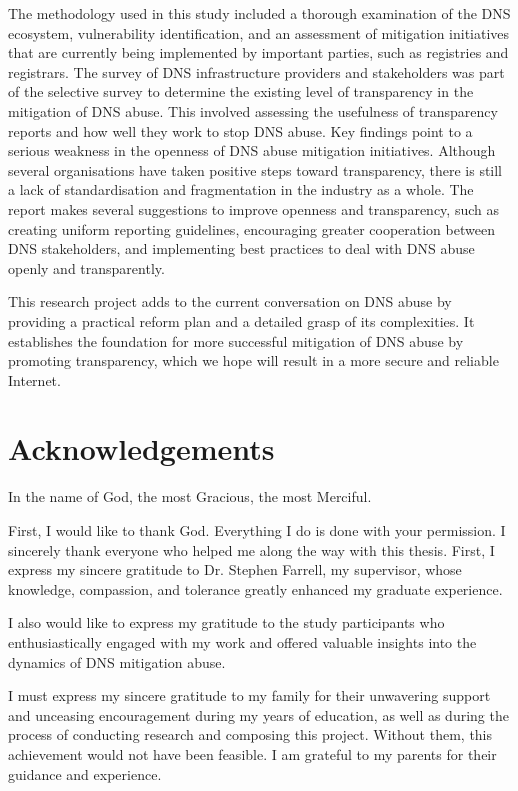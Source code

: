 \documentclass[a4paper,oneside,12pt]{book}
\numberwithin{equation}{chapter} %
\begin{document}
The methodology used in this study included a thorough examination of the DNS ecosystem, vulnerability identification, and an assessment of mitigation initiatives that are currently being implemented by important parties, such as registries and registrars. The survey of DNS infrastructure providers and stakeholders was part of the selective survey to determine the existing level of transparency in the mitigation of DNS abuse. This involved assessing the usefulness of transparency reports and how well they work to stop DNS abuse. Key findings point to a serious weakness in the openness of DNS abuse mitigation initiatives. Although several organisations have taken positive steps toward transparency, there is still a lack of standardisation and fragmentation in the industry as a whole. The report makes several suggestions to improve openness and transparency, such as creating uniform reporting guidelines, encouraging greater cooperation between DNS stakeholders, and implementing best practices to deal with DNS abuse openly and transparently.

This research project adds to the current conversation on DNS abuse by providing a practical reform plan and a detailed grasp of its complexities. It establishes the foundation for more successful mitigation of DNS abuse by promoting transparency, which we hope will result in a more secure and reliable Internet.




\newpage
\onehalfspacing\raggedright %

\section*{\Huge\textcolor{tcd_blue}{Acknowledgements}}

In the name of God, the most Gracious, the most Merciful.

First, I would like to thank God. Everything I do is done with your permission. I sincerely thank everyone who helped me along the way with this thesis. First, I express my sincere gratitude to Dr. Stephen Farrell, my supervisor, whose knowledge, compassion, and tolerance greatly enhanced my graduate experience. 

I also would like to express my gratitude to the study participants who enthusiastically engaged with my work and offered valuable insights into the dynamics of DNS mitigation abuse.

I must express my sincere gratitude to my family for their unwavering support and unceasing encouragement during my years of education, as well as during the process of conducting research and composing this project. Without them, this achievement would not have been feasible. I am grateful to my parents for their guidance and experience.
\end{document}
